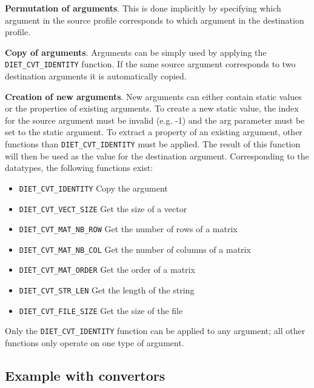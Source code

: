 \begin{description}
\item{\textbf{Permutation of arguments}}. This is done implicitly by
  specifying which argument in the source profile corresponds to which
  argument in the destination profile.
\item{\textbf{Copy of arguments}}. Arguments can be simply used by
  applying the \texttt{DIET\_CVT\_IDENTITY} function. If the same
  source argument corresponds to two destination arguments it is
  automatically copied.
\item{\textbf{Creation of new arguments}}. New arguments can either
  contain static values or the properties of existing arguments. To
  create a new static value, the index for the source argument must be
  invalid (e.g. -1) and the arg parameter must be set to the static
  argument. To extract a property of an existing argument, other
  functions than \texttt{DIET\_CVT\_IDENTITY} must be applied. The
  result of this function will then be used as the value for the
  destination argument.  Corresponding to the \diet datatypes, the
  following functions exist: \\
\begin{itemize}
\item{\texttt{DIET\_CVT\_IDENTITY}} Copy the argument
\item{\texttt{DIET\_CVT\_VECT\_SIZE}} Get the size of a vector
\item{\texttt{DIET\_CVT\_MAT\_NB\_ROW}} Get the number of rows of a matrix
\item{\texttt{DIET\_CVT\_MAT\_NB\_COL}} Get the number of columns of a matrix
\item{\texttt{DIET\_CVT\_MAT\_ORDER}} Get the order of a matrix
\item{\texttt{DIET\_CVT\_STR\_LEN}} Get the length of the string
\item{\texttt{DIET\_CVT\_FILE\_SIZE}} Get the size of the file
\end{itemize}
Only the \texttt{DIET\_CVT\_IDENTITY} function can be applied to any
argument; all other functions only operate on one type of argument.

\end{description}

\subsection{Example with convertors}

